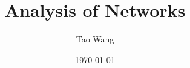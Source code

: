 \documentclass{beamer}
\title[Experimental Results]{Analysis of Networks} %
\author{Tao Wang} %
\institute[Soton] %
{
University of Southampton \\ %
\medskip
\textit{t.wang@soton.ac.uk} %
}
\date{\today} %
\begin{document}
\begin{frame}
\titlepage %
\end{frame}



%
\end{document}

